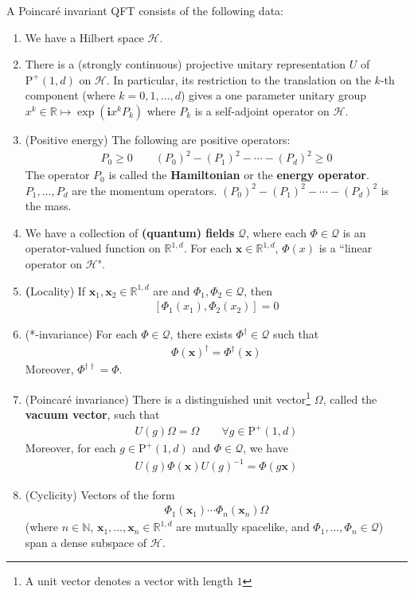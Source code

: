 \documentclass[12pt,b5paper,notitlepage]{article}
\theoremstyle{definition}
\theoremstyle{plain}
\newcommand{\mc}{\mathcal}
\newcommand{\scr}{\mathscr}
\newcommand{\im}{\mathbf{i}}
\newcommand{\mbf}{\mathbf}
\newcommand{\Nbb}{\mathbb N}
\newcommand{\Rbb}{\mathbb R}
\newcommand{\Poid}{{\mathrm P}^+(1,d)}
\newcommand{\xbf}{\mathbf x}
\numberwithin{equation}{section}
\begin{document}
A Poincar\'e invariant QFT consists of the following data:
\begin{enumerate}[label=(\arabic*)]
\item We have a Hilbert space $\mc H$.
\item There is a (strongly continuous) projective unitary representation $U$ of $\Poid$ on $\mc H$. In particular, its restriction to the translation on the $k$-th component (where $k=0,1,\dots,d$) gives a one parameter unitary group $x^k\in\Rbb\mapsto \exp(\im x^k P_k)$ where $P_k$ is a self-adjoint operator on $\mc H$.
\item (Positive energy) The following are positive operators:
\begin{align*}
P_0\geq0\qquad (P_0)^2-(P_1)^2-\cdots-(P_d)^2\geq0
\end{align*}
The operator $P_0$ is called the \textbf{Hamiltonian} or the \textbf{energy operator}. $P_1,\dots,P_d$ are the momentum operators. $(P_0)^2-(P_1)^2-\cdots-(P_d)^2$ is the mass.
\item We have a collection of \textbf{(quantum) fields} $\scr Q$, where each $\Phi\in\scr Q$ is an operator-valued function on $\Rbb^{1,d}$. For each $\mbf x\in\Rbb^{1,d}$, $\Phi(x)$ is a ``linear operator on $\mc H$".  
\item {\textbf(Locality})  If $\xbf_1,\xbf_2\in\Rbb^{1,d}$ are  and $\Phi_1,\Phi_2\in\scr Q$, then
\begin{align}\label{eq18}
[\Phi_1(x_1),\Phi_2(x_2)]=0
\end{align}
\item (*-invariance) For each $\Phi\in\scr Q$, there exists $\Phi^\dagger\in\scr Q$ such that
\begin{align}\label{eq3}
\Phi(\xbf)^\dagger=\Phi^\dagger(\xbf)
\end{align}
Moreover, $\Phi^{\dagger\dagger}=\Phi$.
\item (Poincar\'e invariance) There is a distinguished unit vector\footnote{A unit vector denotes a vector with length $1$} $\Omega$, called the \textbf{vacuum vector}, such that
\begin{align*}
U(g)\Omega=\Omega\qquad\forall g\in\Poid
\end{align*}
Moreover, for each $g\in\Poid$ and $\Phi\in\scr Q$, we have
\begin{align}\label{eq2}
U(g)\Phi(\xbf)U(g)^{-1}=\Phi(g\xbf)
\end{align}
\item (Cyclicity) Vectors of the form
\begin{align}\label{eq4}
\Phi_1(\xbf_1)\cdots\Phi_n(\xbf_n)\Omega
\end{align}
(where $n\in\Nbb$, $\xbf_1,\dots,\xbf_n\in\Rbb^{1,d}$ are mutually spacelike, and $\Phi_1,\dots,\Phi_n\in\scr Q$) span a dense subspace of $\mc H$.
\end{enumerate}
\end{document}
